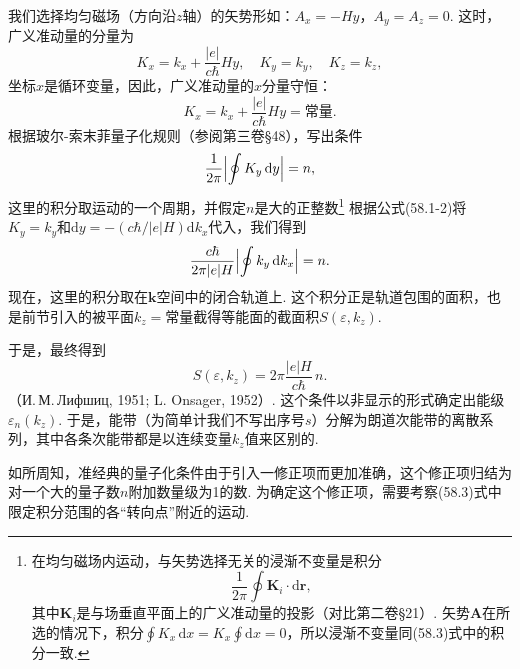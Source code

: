 我们选择均匀磁场（方向沿$z$轴）的矢势形如：$A_x=-Hy$，$A_y=A_z=0$. 这时，广义准动量的分量为
\begin{equation}
K_x=k_x+\frac{|e|}{c\hbar}Hy,\quad K_y=k_y,\quad K_z=k_z,
\label{58.1}
\end{equation}
坐标$x$是循环变量，因此，广义准动量的$x$分量守恒：
\begin{equation}
K_x=k_x+\frac{|e|}{c\hbar}Hy=\text{常量}.
\label{58.2}
\end{equation}
根据玻尔-索末菲量子化规则（参阅第三卷§48），写出条件
\begin{equation}
\frac{1}{2\pi}\Bigl|\oint K_y\,\mathrm dy\Bigr|=n,
\label{58.3}
\end{equation}
这里的积分取运动的一个周期，并假定$n$是大的正整数\footnote{在均匀磁场内运动，与矢势选择无关的浸渐不变量是积分
\begin{equation*}
\frac{1}{2\pi}\oint\bm K_i\cdot\mathrm d\bm r,
\end{equation*}
其中$\bm K_i$是与场垂直平面上的广义准动量的投影（对比第二卷§21）. 矢势$\bm A$在所选的情况下，积分$\oint K_x\,\mathrm dx=K_x\oint\mathrm dx=0$，所以浸渐不变量同(58.3)式中的积分一致.} 根据公式(58.1-2)将$K_y=k_y$和$\mathrm dy=-(c\hbar/|e|H)\mathrm dk_x$代入，我们得到
\begin{equation}
\frac{c\hbar}{2\pi|e|H}\Bigl|\oint k_y\,\mathrm dk_x\Bigr|=n.
\label{58.4}
\end{equation}
现在，这里的积分取在$\bm k$空间中的闭合轨道上. 这个积分正是轨道包围的面积，也是前节引入的被平面$k_z=$常量截得等能面的截面积$S(\varepsilon,k_z)$.

于是，最终得到
\begin{equation}
S(\varepsilon,k_z)=2\pi\frac{|e|H}{c\hbar}\,n.
\label{58.5}
\end{equation}
（И.\,М.\,Лифшиц, 1951; L. Onsager, 1952）. 这个条件以非显示的形式确定出能级$\varepsilon_n(k_z)$. 于是，能带（为简单计我们不写出序号$s$）分解为朗道次能带的离散系列，其中各条次能带都是以连续变量$k_z$值来区别的.

如所周知，准经典的量子化条件由于引入一修正项而更加准确，这个修正项归结为对一个大的量子数$n$附加数量级为1的数. 为确定这个修正项，需要考察(58.3)式中限定积分范围的各“转向点”附近的运动.


